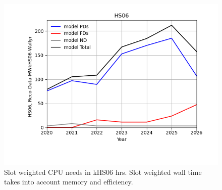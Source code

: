 \begin{figure}[h]
\centering\includegraphics[height=0.4\textwidth]{MoreSim_2022-12-04-2026/MoreSim_2022-12-04-2026-HS06.png}
\caption{Slot weighted CPU needs in kHS06 hrs. Slot weighted wall time takes into account memory and efficiency.}
\label{fig:HS06}
\end{figure}
